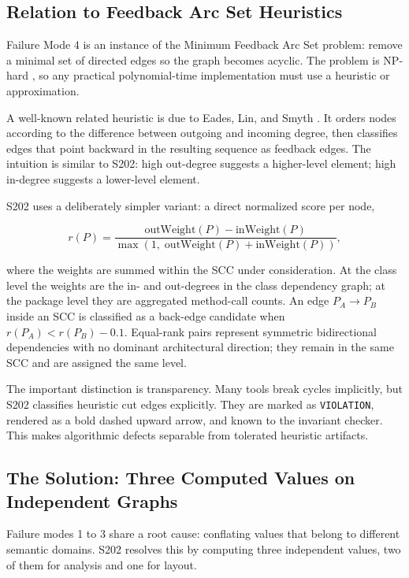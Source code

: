 \documentclass[a4paper,twoside]{article}
\begin{document}
\subsection*{Relation to Feedback Arc Set Heuristics}

Failure Mode 4 is an instance of the Minimum Feedback Arc Set problem: remove a
minimal set of directed edges so the graph becomes acyclic. The problem is
NP-hard \cite{Karp1972}, so any practical polynomial-time implementation must
use a heuristic or approximation.

A well-known related heuristic is due to Eades, Lin, and Smyth \cite{Eades1993}.
It orders nodes according to the difference between outgoing and incoming
degree, then classifies edges that point backward in the resulting sequence as
feedback edges. The intuition is similar to S202: high out-degree
suggests a higher-level element; high in-degree suggests a lower-level
element.

S202 uses a deliberately simpler variant: a direct normalized score per
node,

\[
  r(P) = \frac{\text{outWeight}(P) - \text{inWeight}(P)}
              {\max(1,\; \text{outWeight}(P) + \text{inWeight}(P))},
\]

where the weights are summed within the SCC under consideration. At the class
level the weights are the in- and out-degrees in the class dependency graph;
at the package level they are aggregated method-call counts. An edge
$P_A \to P_B$ inside an SCC is classified as a back-edge candidate when
$r(P_A) < r(P_B) - 0.1$. Equal-rank pairs represent symmetric bidirectional
dependencies with no dominant architectural direction; they remain in the same
SCC and are assigned the same level.

The important distinction is transparency. Many tools break cycles implicitly,
but S202 classifies heuristic cut edges explicitly. They are marked as
\texttt{VIOLATION}, rendered as a bold dashed upward arrow, and known to the
invariant checker. This
makes algorithmic defects separable from tolerated heuristic artifacts.

\subsection*{The Solution: Three Computed Values on Independent Graphs}

Failure modes 1 to 3 share a root cause: conflating values that belong to
different semantic domains. S202 resolves this by computing three independent
values, two of them for analysis and one for layout.
\end{document}
